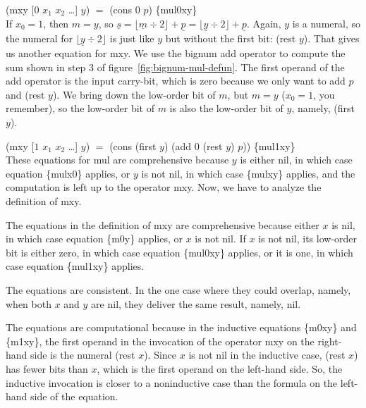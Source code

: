 \vspace{2mm}\hspace*{2cm} \textsf{(mxy [$0$ $x_1$ $x_2$ \dots] $y$)} $=$ \textsf{(cons $0$ $p$)} \hfill \{mul0xy\}\\

If $x_0 = 1$, then $m = y$,
so $\underline{s} = \lfloor \underline{m}\div 2\rfloor + \underline{p} = \lfloor \underline{y}\div 2\rfloor + \underline{p}$.
Again, $y$ is a numeral, so the numeral for $\lfloor \underline{y}\div 2\rfloor$
is just like $y$ but without the first bit: (rest $y$).
That gives us another equation for \textsf{mxy}.
We use the bignum \textsf{add} operator to compute the sum
shown in step 3 of figure~\ref{fig:bignum-mul-defun}.
The first operand of the \textsf{add} operator is the input carry-bit,
which is zero because we only want to add $p$ and \textsf{(rest $y$)}.
We bring down the low-order bit of $m$, but $m = y$
($x_0 = 1$, you remember), so the low-order bit of $m$
is also the low-order bit of $y$, namely, \textsf{(first $y$)}.

\vspace{2mm}\hspace*{2cm} \textsf{(mxy [$1$ $x_1$ $x_2$ \dots] $y$)} $=$ \textsf{(cons (first $y$) (add 0 (rest $y$) $p$))} \hfill \{mul1xy\}\\

These equations for \textsf{mul} are comprehensive because $y$ is either \textsf{nil},
in which case equation \{mulx0\} applies,
or $y$ is not \textsf{nil}, in which case \{mulxy\} applies, and
the computation is left up to the operator \textsf{mxy}.
Now, we have to analyze the definition of \textsf{mxy}.

The equations in the definition of \textsf{mxy} are comprehensive
because either $x$ is \textsf{nil}, in which case
equation \{m0y\} applies, or $x$ is not \textsf{nil}.
If $x$ is not \textsf{nil}, its low-order bit is either zero,
in which case equation \{mul0xy\} applies, or it is one,
in which case equation \{mul1xy\} applies.

The equations are consistent. In the one case
where they could overlap, namely, when both $x$ and $y$
are \textsf{nil}, they deliver the same result, namely, \textsf{nil}.

The equations are computational because in the inductive equations
\{m0xy\} and \{m1xy\}, the first operand in
the invocation of the operator \textsf{mxy} on the right-hand side
is the numeral \textsf{(rest $x$)}.
Since $x$ is not \textsf{nil} in the inductive case,
\textsf{(rest $x$)} has fewer bits than $x$, which is the first operand
on the left-hand side.
So, the inductive invocation is closer to a noninductive
case than the formula on the left-hand side of the equation.

